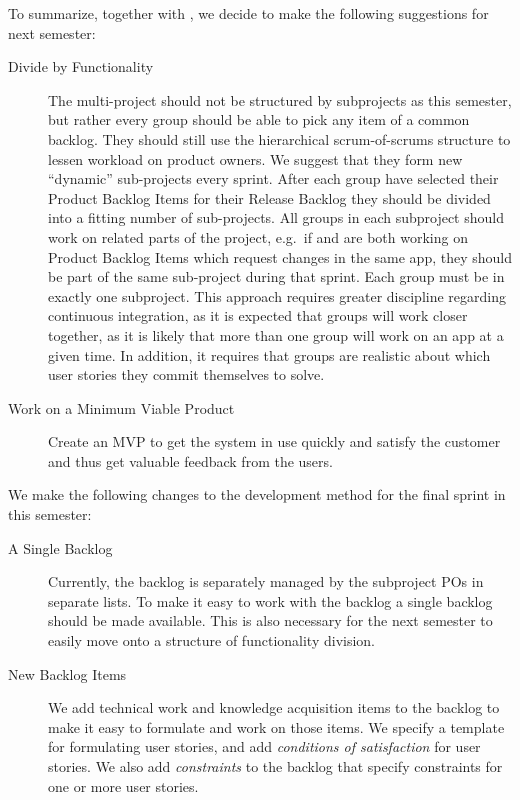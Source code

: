To summarize, together with , we decide to make the following suggestions for next semester:

\begin{description}
  \item[Divide by Functionality] The multi-project should not be structured by subprojects as this semester, but rather every group should be able to pick any item of a common backlog. They should still use the hierarchical scrum-of-scrums structure to lessen workload on product owners. We suggest that they form new ``dynamic'' sub-projects every sprint. After each group have selected their Product Backlog Items for their Release Backlog they should be divided into a fitting number of sub-projects. All groups in each subproject should work on related parts of the project, e.g.\ if  and  are both working on Product Backlog Items which request changes in the same app, they should be part of the same sub-project during that sprint. Each group must be in exactly one subproject. This approach requires greater discipline regarding continuous integration, as it is expected that groups will work closer together, as it is likely that more than one group will work on an app at a given time. In addition, it requires that groups are realistic about which user stories they commit themselves to solve.
  \item[Work on a Minimum Viable Product] Create an MVP to get the system in use quickly and satisfy the customer and thus get valuable feedback from the users.
\end{description}

We make the following changes to the development method for the final sprint in this semester:

\begin{description}
  \item[A Single Backlog] Currently, the backlog is separately managed by the subproject POs in separate lists. To make it easy to work with the backlog a single backlog should be made available. This is also necessary for the next semester to easily move onto a structure of functionality division.
  \item[New Backlog Items] We add technical work and knowledge acquisition items to the backlog to make it easy to formulate and work on those items. We specify a template for formulating user stories, and add \emph{conditions of satisfaction} for user stories. We also add \emph{constraints} to the backlog that specify constraints for one or more user stories.
\end{description}

